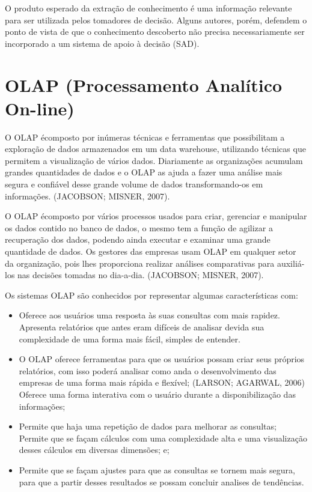 O produto esperado da extra\c{c}\~{a}o de conhecimento \'{e} uma informa\c{c}\~{a}o relevante para ser utilizada pelos tomadores de decis\~{a}o. Alguns autores, por\'{e}m, defendem o ponto de vista de que o conhecimento descoberto n\~{a}o precisa necessariamente ser incorporado a um sistema de apoio \`{a} decis\~{a}o (SAD).

\section{OLAP (Processamento Anal\'{i}tico On-line)}

O OLAP \'{e}composto por inúmeras t\'{e}cnicas e ferramentas que possibilitam a explora\c{c}\~{a}o de dados armazenados em um data warehouse, utilizando t\'{e}cnicas que permitem a visualiza\c{c}\~{a}o de v\'{a}rios dados. Diariamente as organiza\c{c}\~{o}es acumulam grandes quantidades de dados e o OLAP as ajuda a fazer uma an\'{a}lise mais segura e confi\'{a}vel desse grande volume de dados transformando-os em informa\c{c}\~{o}es. (JACOBSON; MISNER, 2007).

O OLAP \'{e}composto por v\'{a}rios processos usados para criar, gerenciar e manipular os dados contido no banco de dados, o mesmo tem a fun\c{c}\~{a}o de agilizar a recupera\c{c}\~{a}o dos dados, podendo ainda executar e examinar uma grande quantidade de dados. Os gestores das empresas usam OLAP em qualquer setor da organiza\c{c}\~{a}o, pois lhes proporciona realizar an\'{a}lises comparativas para auxili\'{a}-los nas decis\~{o}es tomadas no dia-a-dia. (JACOBSON; MISNER, 2007).

Os sistemas OLAP s\~{a}o conhecidos por representar algumas caracter\'{i}sticas com:

\begin{itemize}
    
    \item Oferece aos usu\'{a}rios uma resposta \`{a}s suas consultas com mais rapidez. Apresenta relat\'{o}rios que antes eram dif\'{i}ceis de analisar devida sua complexidade de uma forma mais f\'{a}cil, simples de entender.
    
    \item O OLAP oferece ferramentas para que os usu\'{a}rios possam criar seus pr\'{o}prios relat\'{o}rios, com isso poder\'{a} analisar como anda o desenvolvimento das empresas de uma forma mais r\'{a}pida e flex\'{i}vel; (LARSON; AGARWAL, 2006)
    Oferece uma forma interativa com o usu\'{a}rio durante a disponibiliza\c{c}\~{a}o das informa\c{c}\~{o}es;
    
    \item Permite que haja uma repeti\c{c}\~{a}o de dados para melhorar as consultas;
    Permite que se fa\c{c}am c\'{a}lculos com uma complexidade alta e uma visualiza\c{c}\~{a}o desses c\'{a}lculos em diversas dimens\~{o}es; e;
    
    \item Permite que se fa\c{c}am ajustes para que as consultas se tornem mais segura, para que a partir desses resultados se possam concluir analises de tendências.

\end{itemize}

